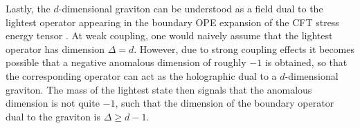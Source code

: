 Lastly, the $d$-dimensional graviton can be understood as a field dual to the lightest operator appearing in the boundary OPE expansion of the CFT stress energy tensor \cite{Aharony:2003qf}. At weak coupling, one would naively assume that the lightest operator has dimension $\Delta = d$. However, due to strong coupling effects it becomes possible that a negative anomalous dimension of roughly $-1$ is obtained, so that the corresponding operator can act as the holographic dual to a $d$-dimensional graviton. The mass of the lightest state then signals that the anomalous dimension is not quite $-1$, such that the dimension of the boundary operator dual to the graviton is $\Delta \geq d-1$. 


